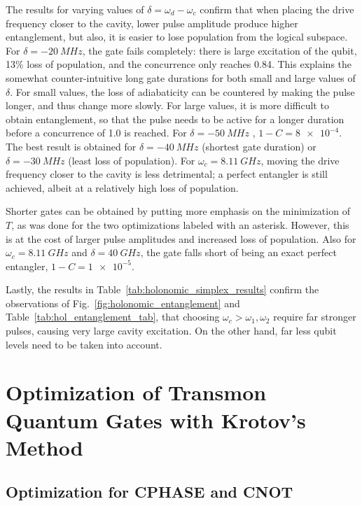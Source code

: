 The results for varying values of $\delta=\omega_d-\omega_c$ confirm that
when placing the drive frequency closer to the cavity, lower pulse amplitude
produce higher entanglement, but also, it is easier to lose population from the
logical subspace. For $\delta = \SI{-20}{MHz}$, the gate fails completely:
there is large excitation of the qubit, 13\% loss of population, and the
concurrence only reaches 0.84. This explains the somewhat counter-intuitive
long gate durations for both small and large values of $\delta$. For small
values, the loss of adiabaticity can be countered by making the pulse longer,
and thus change more slowly. For large values, it is more difficult to obtain
entanglement, so that the pulse needs to be active for a longer duration before
a concurrence of 1.0 is reached. For $\delta = \SI{-50}{MHz}$ ,
$1-C = \num{8e-4}$. The best result is obtained for $\delta = \SI{-40}{MHz}$
(shortest gate duration) or $\delta = \SI{-30}{MHz}$ (least loss of population).
For $\omega_c = \SI{8.11}{GHz}$, moving the drive frequency closer to the cavity
is less detrimental; a perfect entangler is still achieved, albeit at
a relatively high loss of population.

Shorter gates can be obtained by putting more emphasis on the minimization of
$T$, as was done for the two optimizations labeled with an asterisk. However,
this is at the cost of larger pulse amplitudes and increased loss of population.
Also for $\omega_c=\SI{8.11}{GHz}$ and $\delta=\SI{40}{GHz}$, the gate falls
short of being an exact perfect entangler, $1-C = \num{1e-5}$.

Lastly, the results in Table~\ref{tab:holonomic_simplex_results} confirm the
observations of Fig.~\ref{fig:holonomic_entanglement} and
Table~\ref{tab:hol_entanglement_tab}, that choosing
$\omega_c > \omega_{1}, \omega_2$ require far stronger pulses, causing very
large cavity excitation. On the other hand, far less qubit levels need to be
taken into account.


\section[Optimization of Transmon Quantum Gates]{Optimization of Transmon Quantum Gates with Krotov's Method}

\subsection{Optimization for CPHASE and CNOT}
\label{subsec:tm_oct_direct}

